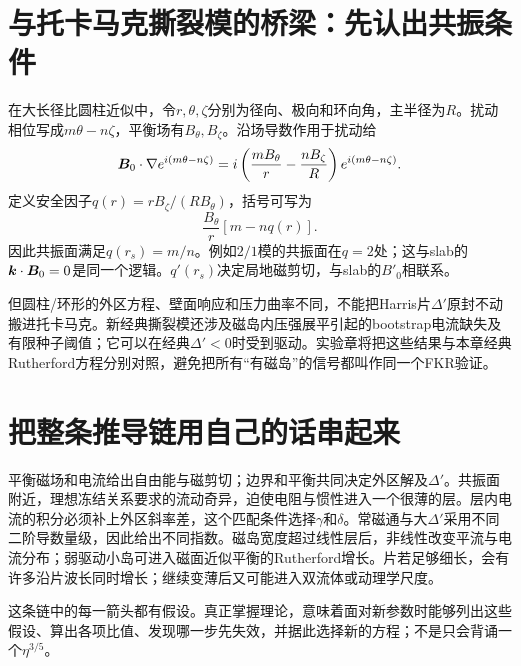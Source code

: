 \section{与托卡马克撕裂模的桥梁：先认出共振条件}
在大长径比圆柱近似中，令$r,\theta,\zeta$分别为径向、极向和环向角，主半径为$R$。扰动相位写成$m\theta-n\zeta$，平衡场有$B_\theta,B_\zeta$。沿场导数作用于扰动给
\begin{equation}
 \bm{B}_0\cdot\nabla e^{i(m\theta-n\zeta)}
 =i\left(\frac{mB_\theta}{r}-\frac{nB_\zeta}{R}\right)
 e^{i(m\theta-n\zeta)}.
\end{equation}
定义安全因子$q(r)=rB_\zeta/(RB_\theta)$，括号可写为
\begin{equation}
 \frac{B_\theta}{r}[m-nq(r)].
\end{equation}
因此共振面满足$q(r_s)=m/n$。例如$2/1$模的共振面在$q=2$处；这与slab的$\bm{k}\cdot\bm{B}_0=0$是同一个逻辑。$q'(r_s)$决定局地磁剪切，与slab的$B'_0$相联系。

但圆柱/环形的外区方程、壁面响应和压力曲率不同，不能把Harris片$\Delta'$原封不动搬进托卡马克。新经典撕裂模还涉及磁岛内压强展平引起的bootstrap电流缺失及有限种子阈值；它可以在经典$\Delta'<0$时受到驱动。实验章将把这些结果与本章经典Rutherford方程分别对照，避免把所有“有磁岛”的信号都叫作同一个FKR验证。

\section{把整条推导链用自己的话串起来}
平衡磁场和电流给出自由能与磁剪切；边界和平衡共同决定外区解及$\Delta'$。共振面附近，理想冻结关系要求的流动奇异，迫使电阻与惯性进入一个很薄的层。层内电流的积分必须补上外区斜率差，这个匹配条件选择$\gamma$和$\delta$。常磁通与大$\Delta'$采用不同二阶导数量级，因此给出不同指数。磁岛宽度超过线性层后，非线性改变平流与电流分布；弱驱动小岛可进入磁面近似平衡的Rutherford增长。片若足够细长，会有许多沿片波长同时增长；继续变薄后又可能进入双流体或动理学尺度。

这条链中的每一箭头都有假设。真正掌握理论，意味着面对新参数时能够列出这些假设、算出各项比值、发现哪一步先失效，并据此选择新的方程；不是只会背诵一个$\eta^{3/5}$。
